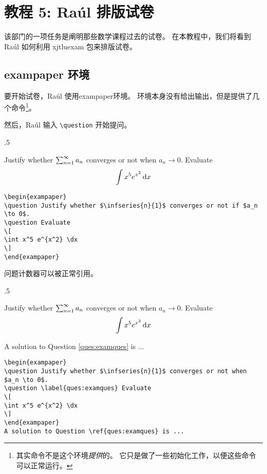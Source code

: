 \newcommand{\raul}{Ra\'ul}
\section{教程 5: \raul{} 排版试卷}
该部门的一项任务是阐明那些数学课程过去的试卷。 在本教程中，我们将看到 \raul{} 如何利用 xjtluexam 包来排版试卷。

\subsection{exampaper 环境}
要开始试卷，\raul{} 使用exampaper环境。 环境本身没有给出输出，但是提供了几个命令\footnote{其实命令不是这个环境\emph{提供}的。 它只是做了一些初始化工作，以便这些命令可以正常运行。}。

然后，\raul{} 输入 \verb=\question= 开始提问。
\begin{miniexammar}{.5\textandmarginlen}{
\begin{exampaper}
\question Justify whether $\sum_{n=1}^{\infty}{a_{n}}$ converges or not when $a_n \to 0$.
\question Evaluate
\[
\int x^5 e^{x^2} \,\mathrm{d} x
\]
\end{exampaper}
}
\begin{lstlisting}
\begin{exampaper}
\question Justify whether $\infseries{n}{1}$ converges or not if $a_n \to 0$.
\question Evaluate
\[
\int x^5 e^{x^2} \dx
\]
\end{exampaper}
\end{lstlisting}
\end{miniexammar}

问题计数器可以被正常引用。
\begin{miniexammar}{.5\textandmarginlen}{
\begin{exampaper}
\question Justify whether $\sum_{n=1}^{\infty}{a_{n}}$ converges or not when $a_n \to 0$.
\question \label{ques:examques} Evaluate
\[
\int x^5 e^{x^2} \,\mathrm{d} x
\]
\end{exampaper}
A solution to Question \ref{ques:examques} is ...
}
\begin{lstlisting}
\begin{exampaper}
\question Justify whether $\infseries{n}{1}$ converges or not when $a_n \to 0$.
\question \label{ques:examques} Evaluate
\[
\int x^5 e^{x^2} \dx
\]
\end{exampaper}
A solution to Question \ref{ques:examques} is ...
\end{lstlisting}
\end{miniexammar}


